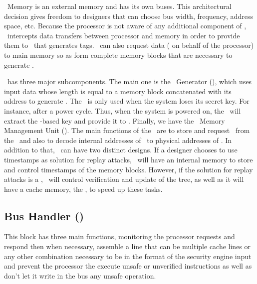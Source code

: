 \ptag~Memory is an external memory and has its own buses. This architectural decision gives freedom to designers that can choose bus width, frequency, address space, etc. Because the processor is not aware of any additional component of \cshia, \handler~intercepts data transfers between processor and memory in order to provide them to \seceng~that generates tags. \handler~can also request data ( on behalf of the processor) to main memory so as  form complete memory blocks that are necessary to generate \ptags.

\seceng~has three major subcomponents. The main one is the \ptag~Generator (\ptaggen), which uses input data whose length is equal to a memory block concatenated with its address to generate \ptags. The \fuzzy~is only used when the system loses its secret key. For instance, after a power cycle. Thus, when the system is powered on, the \fuzzy~will extract the \puf-based key and provide it to \ptaggen. Finally, we have the \ptag~Memory Management Unit (\pmmu). The main functions of the \pmmu~are to store and request \ptags~from the \ptagmem~and also to decode internal addresses of \ptags~to physical addresses of \ptagmem. In addition to that, \pmmu~can have two distinct designs. If a designer chooses to use timestamps as solution for replay attacks, \pmmu~will have an internal memory to store and control timestamps of the memory blocks. However, if the solution for replay attacks is a \mt\cite{Elbaz2009}, \pmmu~will control verification and update of the tree, as well as it will have a cache memory, the \ptagcache, to speed up these tasks.






\subsection{Bus Handler (\handler)}
This block has three main functions, monitoring the processor requests and respond then when necessary, 
assemble a line %
that can be multiple cache lines or any other combination necessary to be in the format
 of the security engine input  and prevent the processor the execute unsafe or unverified instructions
 as well as don't let  it  write in the bus any unsafe operation.
